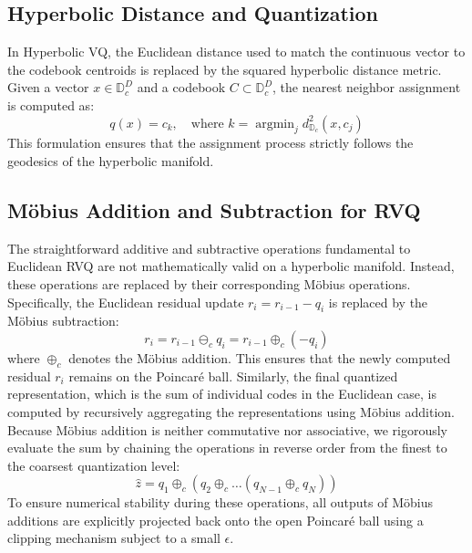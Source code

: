 \documentclass[12pt]{report}
\begin{document}
\subsection{Hyperbolic Distance and Quantization}
In Hyperbolic VQ, the Euclidean distance used to match the continuous vector to the codebook centroids is replaced by the squared hyperbolic distance metric. Given a vector $x \in \mathbb{D}_c^D$ and a codebook $C \subset \mathbb{D}_c^D$, the nearest neighbor assignment is computed as:
\begin{equation}
    q(x) = c_k, \quad \text{where } k = \operatorname{argmin}_j d_{\mathbb{D}_c}^2(x, c_j)
\end{equation}
This formulation ensures that the assignment process strictly follows the geodesics of the hyperbolic manifold.

\subsection{M\"obius Addition and Subtraction for RVQ}
The straightforward additive and subtractive operations fundamental to Euclidean RVQ are not mathematically valid on a hyperbolic manifold. Instead, these operations are replaced by their corresponding M\"obius operations. 
Specifically, the Euclidean residual update $r_i = r_{i-1} - q_i$ is replaced by the M\"obius subtraction:
\begin{equation}
    r_i = r_{i-1} \ominus_c q_i = r_{i-1} \oplus_c (-q_i)
\end{equation}
where $\oplus_c$ denotes the M\"obius addition. This ensures that the newly computed residual $r_i$ remains on the Poincar\'e ball. Similarly, the final quantized representation, which is the sum of individual codes in the Euclidean case, is computed by recursively aggregating the representations using M\"obius addition. Because M\"obius addition is neither commutative nor associative, we rigorously evaluate the sum by chaining the operations in reverse order from the finest to the coarsest quantization level:
\begin{equation}
    \hat{z} = q_1 \oplus_c (q_2 \oplus_c \dots (q_{N-1} \oplus_c q_N))
\end{equation}
To ensure numerical stability during these operations, all outputs of M\"obius additions are explicitly projected back onto the open Poincar\'e ball using a clipping mechanism subject to a small $\epsilon$.
\end{document}
